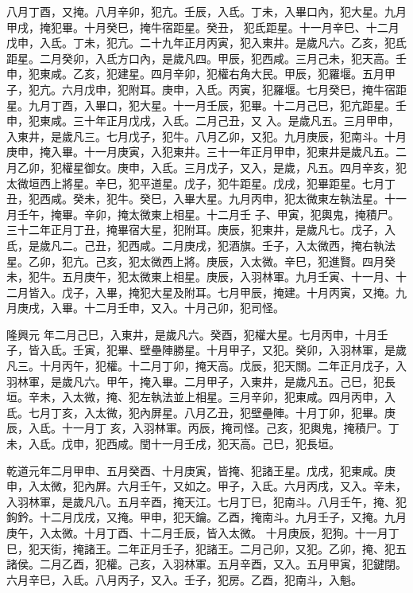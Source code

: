 \begin{pinyinscope}
 八月丁酉，又掩。八月辛卯，犯亢。壬辰，入氐。丁未，入畢口內，犯大星。九月甲戌，掩犯畢。十月癸巳，掩牛宿距星。癸丑，
 犯氐距星。十一月辛巳、十二月戊申，入氐。丁未，犯亢。二十九年正月丙寅，犯入東井。是歲凡六。乙亥，犯氐距星。二月癸卯，入氐方口內，是歲凡四。甲辰，犯西咸。三月己未，犯天高。壬申，犯東咸。乙亥，犯建星。四月辛卯，犯權右角大民。甲辰，犯羅堰。五月甲子，犯亢。六月戊申，犯附耳。庚申，入氐。丙寅，犯羅堰。七月癸巳，掩牛宿距星。九月丁酉，入畢口，犯大星。十一月壬辰，犯畢。十二月己巳，犯亢距星。壬申，犯東咸。三十年正月戊戌，入氐。二月己丑，又
 入。是歲凡五。三月甲申，入東井，是歲凡三。七月戊子，犯牛。八月乙卯，又犯。九月庚辰，犯南斗。十月庚申，掩入畢。十一月庚寅，入犯東井。三十一年正月甲申，犯東井是歲凡五。二月乙卯，犯權星御女。庚申，入氐。三月戊子，又入，是歲，凡五。四月辛亥，犯太微垣西上將星。辛巳，犯平道星。戊子，犯牛距星。戊戌，犯畢距星。七月丁丑，犯西咸。癸未，犯牛。癸巳，入畢大星。九月丙申，犯太微東左執法星。十一月壬午，掩畢。辛卯，掩太微東上相星。十二月壬
 子、甲寅，犯輿鬼，掩積尸。三十二年正月丁丑，掩畢宿大星，犯附耳。庚辰，犯東井，是歲凡七。戊子，入氐，是歲凡二。己丑，犯西咸。二月庚戌，犯酒旗。壬子，入太微西，掩右執法星。乙卯，犯亢。己亥，犯太微西上將。庚辰，入太微。辛巳，犯進賢。四月癸未，犯牛。五月庚午，犯太微東上相星。庚辰，入羽林軍。九月壬寅、十一月、十二月皆入。戊子，入畢，掩犯大星及附耳。七月甲辰，掩建。十月丙寅，又掩。九月庚戌，入畢。十二月壬申，又入。十月己卯，犯司怪。



 隆興元
 年二月己巳，入東井，是歲凡六。癸酉，犯權大星。七月丙申，十月壬子，皆入氐。壬寅，犯畢、壁壘陣勝星。十月甲子，又犯。癸卯，入羽林軍，是歲凡三。十月丙午，犯權。十二月丁卯，掩天高。戊辰，犯天關。二年正月戊子，入羽林軍，是歲凡六。甲午，掩入畢。二月甲子，入東井，是歲凡五。己巳，犯長垣。辛未，入太微，掩、犯左執法並上相星。三月辛卯，犯東咸。四月丙申，入氐。七月丁亥，入太微，犯內屏星。八月乙丑，犯壁壘陣。十月丁卯，犯畢。庚辰，入氐。十一月丁
 亥，入羽林軍。丙辰，掩司怪。己亥，犯輿鬼，掩積尸。丁未，入氐。戊申，犯西咸。閏十一月壬戌，犯天高。己巳，犯長垣。



 乾道元年二月甲申、五月癸酉、十月庚寅，皆掩、犯諸王星。戊戌，犯東咸。庚申，入太微，犯內屏。六月壬午，又如之。甲子，入氐。六月丙戌，又入。辛未，入羽林軍，是歲凡八。五月辛酉，掩天江。七月丁巳，犯南斗。八月壬午，掩、犯鉤鈐。十二月戊戌，又掩。甲申，犯天鑰。乙酉，掩南斗。九月壬子，又掩。九月庚午，入太微。十月丁酉、十二月壬辰，皆入太微。
 十月庚辰，犯狗。十一月丁巳，犯天街，掩諸王。二年正月壬子，犯諸王。二月己卯，又犯。乙卯，掩、犯五諸侯。二月乙酉，犯權。己亥，入羽林軍。五月辛酉，又入。五月甲寅，犯鍵閉。六月辛巳，入氐。八月丙子，又入。壬子，犯房。乙酉，犯南斗，入魁。




\end{pinyinscope}
